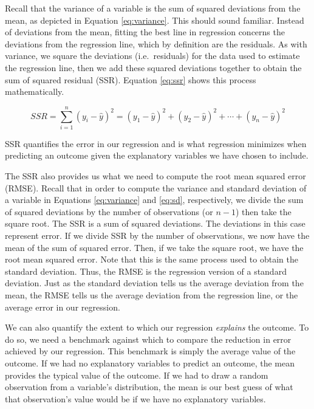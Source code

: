 \documentclass[
]{book}
\begin{document}
Recall that the variance of a variable is the sum of squared deviations from the mean, as depicted in Equation \eqref{eq:variance}. This should sound familiar. Instead of deviations from the mean, fitting the best line in regression concerns the deviations from the regression line, which by definition are the residuals. As with variance, we square the deviations (i.e.~residuals) for the data used to estimate the regression line, then we add these squared deviations together to obtain the sum of squared residual (SSR). Equation \eqref{eq:ssr} shows this process mathematically.

\begin{equation}
SSR=\sum _{i=1}^{n}(y_{i}-\hat{y})^2= (y_{1}-\hat{y})^2+(y_{2}-\hat{y})^2+\cdots +(y_{n}-\hat{y})^2
\label{eq:ssr}
\end{equation}

SSR quantifies the error in our regression and is what regression minimizes when predicting an outcome given the explanatory variables we have chosen to include.

The SSR also provides us what we need to compute the root mean squared error (RMSE). Recall that in order to compute the variance and standard deviation of a variable in Equations \eqref{eq:variance} and \eqref{eq:sd}, respectively, we divide the sum of squared deviations by the number of observations (or \(n-1\)) then take the square root. The SSR is a sum of squared deviations. The deviations in this case represent error. If we divide SSR by the number of observations, we now have the mean of the sum of squared error. Then, if we take the square root, we have the root mean squared error. Note that this is the same process used to obtain the standard deviation. Thus, the RMSE is the regression version of a standard deviation. Just as the standard deviation tells us the average deviation from the mean, the RMSE tells us the average deviation from the regression line, or the average error in our regression.

We can also quantify the extent to which our regression \emph{explains} the outcome. To do so, we need a benchmark against which to compare the reduction in error achieved by our regression. This benchmark is simply the average value of the outcome. If we had no explanatory variables to predict an outcome, the mean provides the typical value of the outcome. If we had to draw a random observation from a variable's distribution, the mean is our best guess of what that observation's value would be if we have no explanatory variables.
\end{document}
